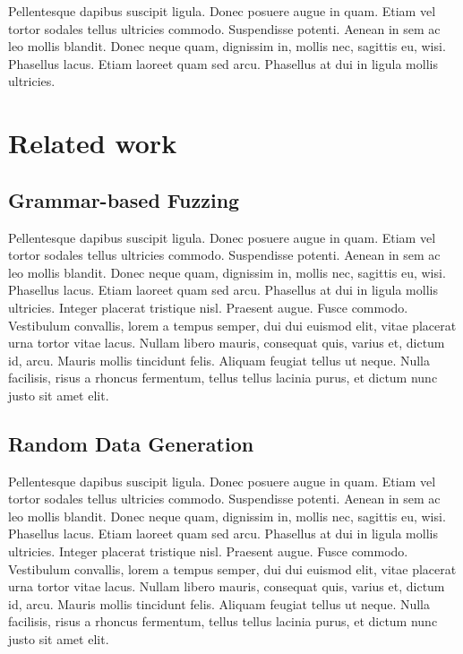 \documentclass[acmsmall, anonymous]{acmart}
\begin{document}
Pellentesque dapibus suscipit ligula. Donec posuere augue in quam. Etiam vel
tortor sodales tellus ultricies commodo. Suspendisse potenti. Aenean in sem ac
leo mollis blandit. Donec neque quam, dignissim in, mollis nec, sagittis eu,
wisi. Phasellus lacus. Etiam laoreet quam sed arcu. Phasellus at dui in ligula
mollis ultricies.

\section{Related work}
\label{sec:related}


\subsection{Grammar-based Fuzzing}

Pellentesque dapibus suscipit ligula. Donec posuere augue in quam. Etiam vel
tortor sodales tellus ultricies commodo. Suspendisse potenti. Aenean in sem ac
leo mollis blandit. Donec neque quam, dignissim in, mollis nec, sagittis eu,
wisi. Phasellus lacus. Etiam laoreet quam sed arcu. Phasellus at dui in ligula
mollis ultricies. Integer placerat tristique nisl. Praesent augue. Fusce
commodo. Vestibulum convallis, lorem a tempus semper, dui dui euismod elit,
vitae placerat urna tortor vitae lacus. Nullam libero mauris, consequat quis,
varius et, dictum id, arcu. Mauris mollis tincidunt felis. Aliquam feugiat
tellus ut neque. Nulla facilisis, risus a rhoncus fermentum, tellus tellus
lacinia purus, et dictum nunc justo sit amet elit.

\subsection{Random Data Generation}


Pellentesque dapibus suscipit ligula. Donec posuere augue in quam. Etiam vel
tortor sodales tellus ultricies commodo. Suspendisse potenti. Aenean in sem ac
leo mollis blandit. Donec neque quam, dignissim in, mollis nec, sagittis eu,
wisi. Phasellus lacus. Etiam laoreet quam sed arcu. Phasellus at dui in ligula
mollis ultricies. Integer placerat tristique nisl. Praesent augue. Fusce
commodo. Vestibulum convallis, lorem a tempus semper, dui dui euismod elit,
vitae placerat urna tortor vitae lacus. Nullam libero mauris, consequat quis,
varius et, dictum id, arcu. Mauris mollis tincidunt felis. Aliquam feugiat
tellus ut neque. Nulla facilisis, risus a rhoncus fermentum, tellus tellus
lacinia purus, et dictum nunc justo sit amet elit.
\end{document}
